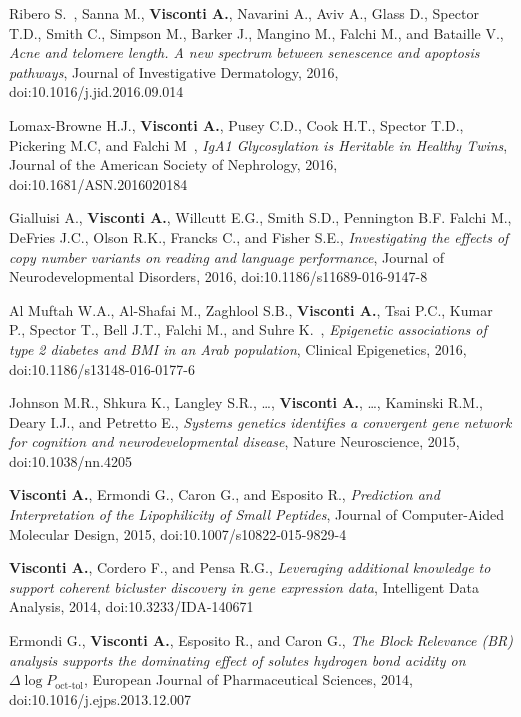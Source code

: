 \begin{itemize}
		 Ribero S.\cofirst ~\corresponding, Sanna M.\cofirst, \textbf{Visconti A.}, Navarini A., Aviv A., Glass D., Spector T.D., Smith C., Simpson M., Barker J., Mangino M., Falchi M.\colast, and Bataille V.\colast, \emph{Acne and telomere length. A new spectrum between senescence and apoptosis pathways}, Journal of Investigative Dermatology, 2016, doi:10.1016/j.jid.2016.09.014 %

		 Lomax-Browne H.J.\cofirst, \textbf{Visconti A.}\cofirst, Pusey C.D., Cook H.T., Spector T.D., Pickering M.C\colast, and Falchi M\colast ~\corresponding, \emph{IgA1 Glycosylation is Heritable in Healthy Twins}, Journal of the American Society of Nephrology, 2016, doi:10.1681/ASN.2016020184 

		 Gialluisi A., \textbf{Visconti A.}, Willcutt E.G., Smith S.D., Pennington B.F. Falchi M., DeFries J.C.,  Olson R.K., Francks C.\corresponding, and Fisher S.E.\corresponding, \emph{Investigating the effects of copy number variants on reading and language performance}, Journal of Neurodevelopmental Disorders, 2016, doi:10.1186/s11689-016-9147-8 %

		 Al Muftah W.A.\cofirst, Al-Shafai M.\cofirst, Zaghlool S.B., \textbf{Visconti A.}, Tsai P.C., Kumar P., Spector T., Bell J.T., Falchi M.\colast, and Suhre K.\colast ~\corresponding, \emph{Epigenetic associations of type 2 diabetes and BMI in an Arab population}, Clinical Epigenetics, 2016, doi:10.1186/s13148-016-0177-6  %
	
		 Johnson M.R.\corresponding, Shkura K., Langley S.R., \dots, \textbf{Visconti A.}, \dots, Kaminski R.M., Deary I.J., and Petretto E.\corresponding, \emph{Systems genetics identifies a convergent gene network for cognition and neurodevelopmental disease}, Nature Neuroscience, 2015, doi:10.1038/nn.4205  %
	
		 \textbf{Visconti A.}, Ermondi G.\corresponding, Caron G., and Esposito R., \emph{Prediction and Interpretation of the Lipophilicity of Small Peptides}, Journal of Computer-Aided Molecular Design, 2015, doi:10.1007/s10822-015-9829-4 %
	
		 \textbf{Visconti A.}, Cordero F., and Pensa R.G.\corresponding, \emph{Leveraging additional knowledge to support coherent bicluster discovery in gene expression data}, Intelligent Data Analysis, 2014, doi:10.3233/IDA-140671 %

		 Ermondi G., \textbf{Visconti A.}, Esposito R., and Caron G.\corresponding, \emph{The Block Relevance (BR) analysis supports the dominating effect of solutes hydrogen bond acidity on $\Delta \log P_{\text{oct-tol}}$}, European Journal of Pharmaceutical Sciences, 2014, doi:10.1016/j.ejps.2013.12.007 %



\end{itemize}
